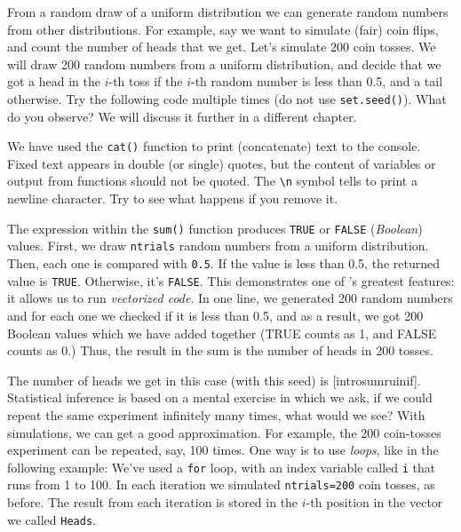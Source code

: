 From a random draw of a uniform distribution we can generate random numbers from
other distributions. For example, say we want to simulate (fair) coin flips, and
count the number of heads that we get. Let's simulate 200 coin
tosses. We will draw 200 random numbers from a uniform distribution, and decide
that we got a head in the $i$-th toss if the $i$-th random number is less than
0.5, and a tail otherwise.
Try the following code multiple times (do not use \lstinline{set.seed()}). What do you
observe? We will discuss it further in a different chapter.


We have used the \lstinline{cat()} function to print (concatenate) text to the console.
Fixed text appears in double (or single) quotes, but the content of variables or
output from \R functions should not be quoted. The \lstinline{\n} symbol tells \R
to print a newline character. Try to see what happens if you remove it.


The expression within the \lstinline{sum()} function produces \lstinline{TRUE} or
\lstinline{FALSE} (\emph{Boolean}) values. First, we draw \lstinline{ntrials}
random numbers from a uniform distribution. Then, each one is compared with
\lstinline{0.5}. If the value is less than 0.5, the returned value is \lstinline{TRUE}.
Otherwise, it's \lstinline{FALSE}. This demonstrates one of \R's greatest features:
it allows us to run \emph{vectorized code}. 
In one line, we generated 200 random
numbers and for each one we checked if it is less than 0.5, and as a result, we
got 200 Boolean values which we have added together (TRUE counts as 1,
and FALSE counts as 0.) Thus, the result in the sum is the number of heads
in 200 tosses.


The number of heads we get in this case (with this seed) is 
[introsumruinif]. Statistical inference is based
on a mental exercise in which we ask, if we could repeat the same experiment
infinitely many times, what would we see? With simulations, we can get a good
approximation. For example, the 200 coin-tosses experiment can be repeated,
say, 100 times. One way is to use \emph{loops},  like in the following example:
We've used a \lstinline{for} loop, with an index variable called \lstinline{i} that
runs from 1 to 100. In each iteration we simulated \lstinline{ntrials=200} coin
tosses, as before. The result from each iteration is stored in the $i$-th position
in the vector we called \lstinline{Heads}. 


